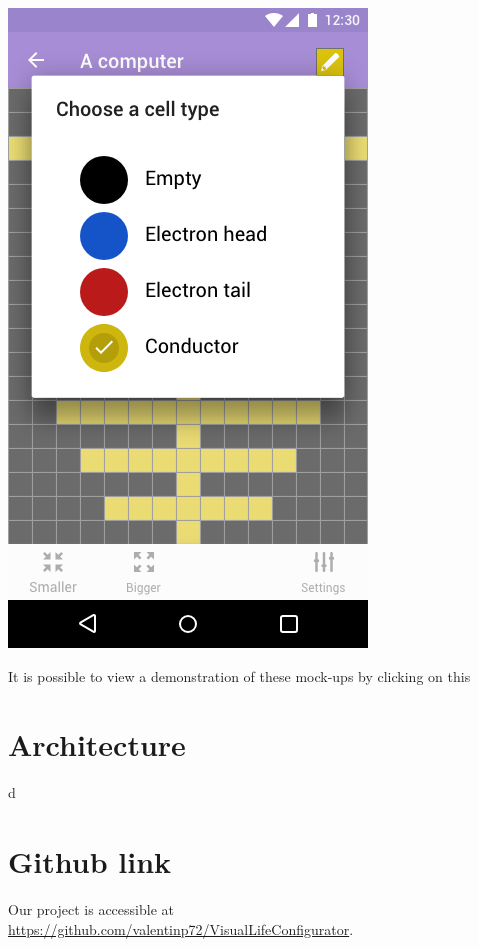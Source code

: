 \documentclass{report}
\begin{document}
\begin{minipage}{.45\textwidth}
  \begin{minipage}{.45\linewidth}
    \includegraphics[width=\linewidth]{../mock-ups/Edit_game_popup.png}
  \end{minipage}\hfill
  \begin{minipage}{.45\linewidth}
  \end{minipage}%
\end{minipage} \hfill

\vspace{12pt}
It is possible to view a demonstration of these mock-ups by clicking on this

\section{Architecture}
d

\section{Github link}
Our project is accessible at \url{https://github.com/valentinp72/VisualLifeConfigurator}.
\end{document}
